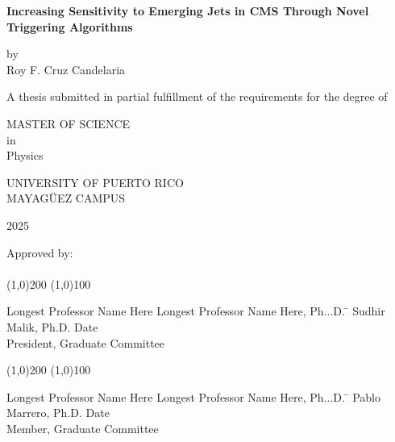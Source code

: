 



\thispagestyle{empty}
\begin{center}
\begin{singlespace}
\textbf{Increasing Sensitivity to Emerging Jets in CMS Through Novel Triggering Algorithms}
\end{singlespace}
\vspace{4 mm}
by
\\
\vspace{4 mm}
Roy F. Cruz Candelaria %
\vspace{4 mm}
\begin{singlespace}
A thesis submitted in partial fulfillment of the requirements for the degree of %
\end{singlespace}
\vspace{4 mm}
MASTER OF SCIENCE %
\\
in
\\
Physics %
\\
\vspace{4 mm}
\begin{singlespace}

UNIVERSITY OF PUERTO RICO
\\
MAYAG\"UEZ CAMPUS
\end{singlespace}

2025 %
\end{center}
\bigskip
\bigskip
\bigskip
\bigskip
\bigskip
\bigskip
\bigskip

  \noindent Approved by:
\\
\\

\noindent
\line(1,0){200} \hspace{40 mm} \line(1,0){100}\\
\noindent
\vspace{-1.75\baselineskip}
\begin{tabbing}
Longest Professor Name Here Longest Professor Name Here, Ph...D. \=  \kill 
Sudhir Malik, Ph.D. \>  Date\\President, Graduate Committee  %
\end{tabbing}



\noindent
\line(1,0){200} \hspace{40 mm} \line(1,0){100}\\
\noindent
\vspace{-1.75\baselineskip}
\begin{tabbing}
Longest Professor Name Here Longest Professor Name Here, Ph...D. \=  \kill 
Pablo Marrero, Ph.D. \>  Date\\Member, Graduate Committee
\end{tabbing}


